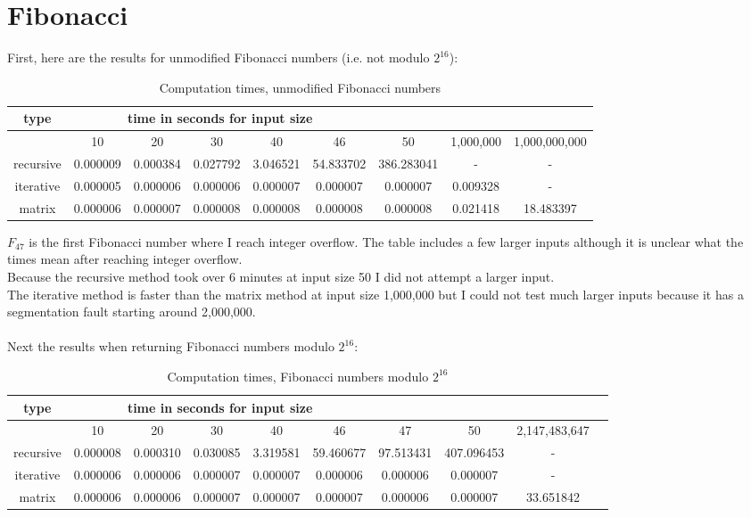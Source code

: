\documentclass[11pt]{article}
\begin{document}
\section{Fibonacci}
First, here are the results for unmodified Fibonacci numbers (i.e. not modulo $2^{16}$):
\begin{table}[h]
\begin{tabular}{c c c c c c c c c}
type & \multicolumn{5}{c}{time in seconds for input size}\\ \hline
& 10 & 20 & 30 & 40 & 46 & 50 & 1,000,000 & 1,000,000,000\\ \hline
recursive & 0.000009 & 0.000384 & 0.027792 & 3.046521 & 54.833702 & 386.283041 & - & - \\
iterative & 0.000005 & 0.000006 & 0.000006 & 0.000007 & 0.000007 & 0.000007 & 0.009328 & - \\
matrix & 0.000006 & 0.000007 & 0.000008 & 0.000008 & 0.000008 & 0.000008 & 0.021418 & 18.483397 \\
\end{tabular}
\caption{Computation times, unmodified Fibonacci numbers}
\end{table}

$F_{47}$ is the first Fibonacci number where I reach integer overflow. The table includes a few larger inputs although it is unclear what the times mean after reaching integer overflow. \\
Because the recursive method took over 6 minutes at input size 50 I did not attempt a larger input. \\
The iterative method is faster than the matrix method at input size 1,000,000 but I could not test much larger inputs because it has a segmentation fault starting around 2,000,000.
\\
\\
Next the results when returning Fibonacci numbers modulo $2^{16}$:
\begin{table}[h]
\begin{tabular}{c c c c c c c c c c}
type & \multicolumn{5}{c}{time in seconds for input size}\\ \hline
& 10 & 20 & 30 & 40 & 46 & 47 & 50 & 2,147,483,647 \\ \hline
recursive & 0.000008 & 0.000310 & 0.030085 & 3.319581 & 59.460677 & 97.513431 & 407.096453 & - \\
iterative & 0.000006  & 0.000006 & 0.000007 & 0.000007 & 0.000006 & 0.000006 & 0.000007 & -  \\
matrix & 0.000006 & 0.000006 & 0.000007 & 0.000007 & 0.000007 & 0.000006 & 0.000007 & 33.651842 \\
\end{tabular}
\caption{Computation times, Fibonacci numbers modulo $2^{16}$}
\end{table}
\end{document}
